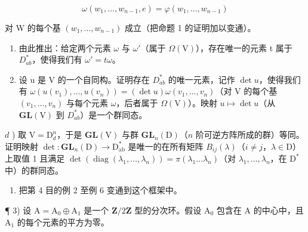 \[
\omega (w _ {1}, \dots , w _ {n - 1}, e) = \varphi (w _ {1}, \dots , w _ {n - 1})
\]

对 W 的每个基 \((w_{1},\ldots ,w_{n - 1})\) 成立（把命题 1 的证明加以变通）。

\begin{enumerate}
\def\labelenumi{\alph{enumi})}
\setcounter{enumi}{1}
\item
  由此推出：给定两个元素 \(\omega\) 与 \(\omega'\)（属于 \(\Omega(\mathrm{V})\)），存在唯一的元素 t 属于 \(D_{ab}^{*}\)，使得我们有 \(\omega' = t\omega\)。
\item
  设 u 是 V 的一个自同构。证明存在 \(D_{ab}^{*}\) 的唯一元素，记作 \(\det u\)，使得我们有 \(\omega(u(v_{1}),\ldots,u(v_{n}))=(\det u)\omega(v_{1},\ldots,v_{n})\)（对 V 的每个基 \((v_{1},\ldots,v_{n})\) 与每个元素 \(\omega\)，后者属于 \(\Omega(\mathrm{V})\)）。映射 \(u\mapsto\det u\)（从 \(\mathbf{GL}(\mathrm{V})\) 到 \(D_{ab}^{*}\)）是一个群同态。
\end{enumerate}

\(d\) ) 取 \(\mathrm{V} = \mathrm{D}_d^n\)，于是 \(\mathbf{GL}(\mathrm{V})\) 与群 \(\mathbf{GL}_n(\mathrm{D})\)（\(n\) 阶可逆方阵所成的群）等同。证明映射 \(\operatorname{det}:\mathbf{GL}_n(\mathrm{D})\to \mathrm{D}_{\mathrm{ab}}^*\) 是唯一的在所有矩阵 \(B_{ij}(\lambda)\)（\(i\neq j\)，\(\lambda \in \mathrm{D}\)）上取值 1 且满足 \(\operatorname{det}(\operatorname{diag}(\lambda_1,\dots ,\lambda_n)) = \pi (\lambda_1\dots \lambda_n)\)（对 \(\lambda_1,\ldots ,\lambda_n\)，在 \(\mathrm{D}^*\) 中）的群同态。

\begin{enumerate}
\def\labelenumi{\alph{enumi})}
\setcounter{enumi}{4}
\tightlist
\item
  把第 4 目的例 2 至例 6 变通到这个框架中。
\end{enumerate}

¶ 3) 设 \(\mathrm{A} = \mathrm{A}_0 \oplus \mathrm{A}_1\) 是一个 \(\mathbf{Z}/2\mathbf{Z}\) 型的分次环。假设 \(\mathrm{A}_0\) 包含在 \(\mathrm{A}\) 的中心中，且 \(\mathrm{A}_1\) 的每个元素的平方为零。

